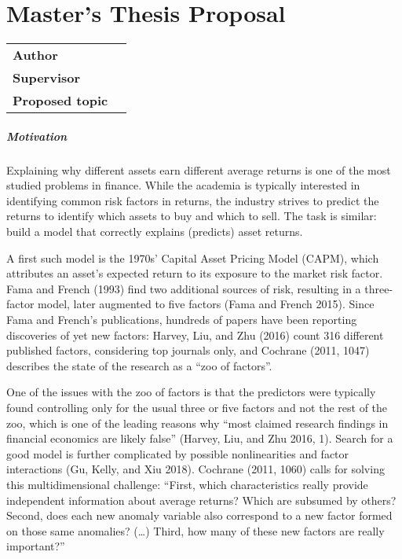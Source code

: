 \chapter*{Master's Thesis Proposal}

\begin{tabular}{lp{10.1cm}}
		\hline
		\textbf{Author} &\href{mailto:\Email}{\AutorDP}\\
		\textbf{Supervisor} &\href{mailto:\EmailSup}{\Supervisor}\\
		\textbf{Proposed topic} &\Bookname\\
		\hline
\end{tabular}

\bigskip

\small
\paragraph{Motivation}

Explaining why different assets earn different average returns is one of the most studied problems in finance. While the academia is typically interested in identifying common risk factors in returns, the industry strives to predict the returns to identify which assets to buy and which to sell. The task is similar: build a model that correctly explains (predicts) asset returns.   

A first such model is the 1970s’ Capital Asset Pricing Model (CAPM), which attributes an asset’s expected return to its exposure to the market risk factor. Fama and French (1993) find two additional sources of risk, resulting in a three-factor model, later augmented to five factors (Fama and French 2015). Since Fama and French’s publications, hundreds of papers have been reporting discoveries of yet new factors: Harvey, Liu, and Zhu (2016) count 316 different published factors, considering top journals only, and Cochrane (2011, 1047) describes the state of the research as a “zoo of factors”. 

One of the issues with the zoo of factors is that the predictors were typically found controlling only for the usual three or five factors and not the rest of the zoo, which is one of the leading reasons why “most claimed research findings in financial economics are likely false” (Harvey, Liu, and Zhu 2016, 1). Search for a good model is further complicated by possible nonlinearities and factor interactions (Gu, Kelly, and Xiu 2018). Cochrane (2011, 1060) calls for solving this multidimensional challenge: “First, which characteristics really provide independent information about average returns? Which are subsumed by others? Second, does each new anomaly variable also correspond to a new factor formed on those same anomalies? (\ldots) Third, how many of these new factors are really important?”  

